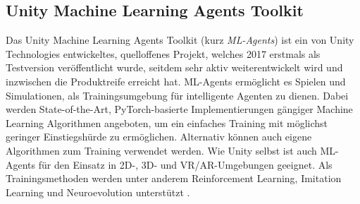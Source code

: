 \subsection{Unity Machine Learning Agents Toolkit}
Das Unity Machine Learning Agents Toolkit (kurz \emph{ML-Agents}) ist ein von Unity Technologies entwickeltes, quelloffenes Projekt, welches 2017 erstmals als Testversion veröffentlicht wurde, seitdem sehr aktiv weiterentwickelt wird und inzwischen die Produktreife erreicht hat.
ML-Agents ermöglicht es Spielen und Simulationen, als Trainingsumgebung für intelligente Agenten zu dienen.
Dabei werden State-of-the-Art, PyTorch-basierte Implementierungen gängiger Machine Learning Algorithmen angeboten, um ein einfaches Training mit möglichst geringer Einstiegshürde zu ermöglichen.
Alternativ können auch eigene Algorithmen zum Training verwendet werden.
Wie Unity selbst ist auch ML-Agents für den Einsatz in 2D-, 3D- und VR/AR-Umgebungen geeignet.
Als Trainingsmethoden werden unter anderem Reinforcement Learning, Imitation Learning und Neuroevolution unterstützt \cite{mlagentsDocHome}.


